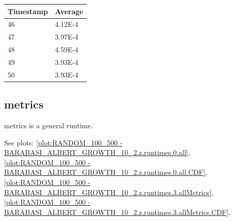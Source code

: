 \begin{tabular}{|l||l|}
\hline
	\textbf{Timestamp} & \textbf{Average} \\ \hline
	46 & 4.12E-4 \\ \hline
	47 & 3.97E-4 \\ \hline
	48 & 4.59E-4 \\ \hline
	49 & 3.93E-4 \\ \hline
	50 & 3.93E-4 \\ \hline
\end{tabular}

\subsection{metrics}
metrics is a general runtime.

See plots: \ref{plot:RANDOM_100_500 - BARABASI_ALBERT_GROWTH_10_2.z.runtimes.0.all}, \ref{plot:RANDOM_100_500 - BARABASI_ALBERT_GROWTH_10_2.z.runtimes.0.all.CDF}, \ref{plot:RANDOM_100_500 - BARABASI_ALBERT_GROWTH_10_2.z.runtimes.3.allMetrics}, \ref{plot:RANDOM_100_500 - BARABASI_ALBERT_GROWTH_10_2.z.runtimes.3.allMetrics.CDF}.

